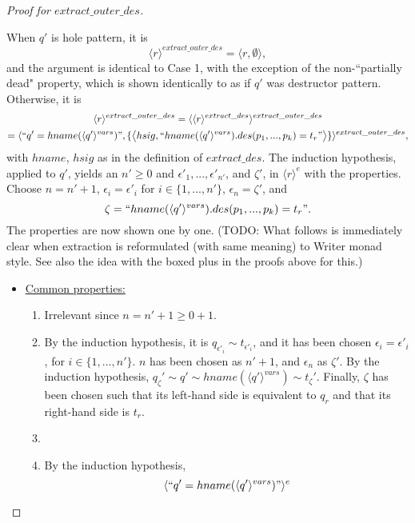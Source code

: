 \documentclass[11pt]{article} %
\begin{document}
\begin{proof}[Proof for $extract\_outer\_des$]
\begin{itemize}
When $q'$ is hole pattern, it is
\begin{equation*}
\langle r \rangle^{extract\_outer\_des} = \big\langle r, \emptyset \big\rangle,
\end{equation*}
and the argument is identical to Case 1, with the exception of the non-``partially dead" property, which is shown identically to as if $q'$ was destructor pattern. Otherwise, it is
\begin{multline*}
\langle r \rangle^{extract\_outer\_des} = \langle \langle r \rangle^{extract\_des} \rangle^{extract\_outer\_des}\\
= \langle `` q' = hname(\langle q' \rangle^{vars}) ", \{\big\langle hsig, `` hname(\langle q' \rangle^{vars}).des(p_1, ..., p_k) = t_r " \big\rangle \} \rangle^{extract\_outer\_des},
\end{multline*}
with $hname$, $hsig$ as in the definition of $extract\_des$. The induction hypothesis, applied to $q'$, yields an $n' \geq 0$ and $\epsilon'_1, ..., \epsilon'_{n'}$, and $\zeta'$, in $\langle r \rangle^e$ with the properties. Choose $n = n' + 1$, $\epsilon_i = \epsilon'_i$ for $i \in \{1, ..., n'\}$, $\epsilon_n = \zeta'$, and
\begin{equation*}
\zeta = `` hname(\langle q' \rangle^{vars}).des(p_1, ..., p_k) = t_r ".
\end{equation*} The properties are now shown one by one. (TODO: What follows is immediately clear when extraction is reformulated (with same meaning) to Writer monad style. See also the idea with the boxed plus in the proofs above for this.)
\begin{itemize}
\item \underline{Common properties:}
\begin{enumerate}
\item Irrelevant since $n = n' + 1 \geq 0 + 1$.
\item By the induction hypothesis, it is $q_{\epsilon'_i} \sim t_{\epsilon'_i}$, and it has been chosen $\epsilon_i = \epsilon'_i$, for $i \in \{1, ..., n'\}$. $n$ has been chosen as $n' + 1$, and $\epsilon_n$ as $\zeta'$. By the induction hypothesis, $q_\zeta' \sim q' \sim hname(\langle q' \rangle^{vars}) \sim t_\zeta'$. Finally, $\zeta$ has been chosen such that its left-hand side is equivalent to $q_r$ and that its right-hand side is $t_r$.
\item
\item By the induction hypothesis,
\begin{equation*}
\langle `` q' = hname(\langle q' \rangle^{vars}) " \rangle^e

\end{equation*}
\end{enumerate}
\end{itemize}
\end{itemize}
\end{proof}
\end{document}
